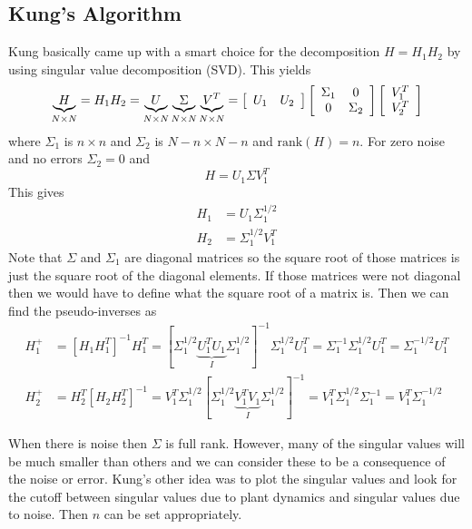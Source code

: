 \subsection{Kung's Algorithm}
Kung basically came up with a smart choice for the decomposition $H=H_1H_2$ by using singular value decomposition (SVD). This yields
$$\underbrace{H}_{N\times N} = H_1H_2 = \underbrace{U}_{N\times N} \underbrace{\Sigma}_{N\times N} \underbrace{V^T}_{N\times N} = \left[\begin{array}{c c} U_1 & U_2 \end{array}\right] \left[\begin{array}{c c} \Sigma_1 & 0 \\ 0 & \Sigma_2 \end{array}\right] \left[\begin{array}{c} V_1^T \\ V_2^T \end{array}\right]$$
where $\Sigma_1$ is $n\times n$ and $\Sigma_2$ is $N-n\times N-n$ and $\text{rank}(H)=n$. For zero noise and no errors $\Sigma_2=0$ and
$$H=U_1\Sigma V_1^T$$
This gives
\begin{align*}
H_1 &= U_1\Sigma_1^{1/2} \\
H_2 &= \Sigma_1^{1/2}V_1^T
\end{align*}
Note that $\Sigma$ and $\Sigma_1$ are diagonal matrices so the square root of those matrices is just the square root of the diagonal elements. If those matrices were not diagonal then we would have to define what the square root of a matrix is. Then we can find the pseudo-inverses as
\begin{align*}
H_1^+ &= [H_1H_1^T]^{-1}H_1^T = [\Sigma_1^{1/2}\underbrace{U_1^TU_1}_{I}\Sigma_1^{1/2}]^{-1}\Sigma_1^{1/2}U_1^T = \Sigma_1^{-1}\Sigma_1^{1/2}U_1^T = \Sigma_1^{-1/2}U_1^T \\
H_2^+ &= H_2^T[H_2H_2^T]^{-1} = V_1^T\Sigma_1^{1/2}[\Sigma_1^{1/2}\underbrace{V_1^TV_1}_{I}\Sigma_1^{1/2}]^{-1} = V_1^T\Sigma_1^{1/2}\Sigma_1^{-1} = V_1^T\Sigma_1^{-1/2}
\end{align*}

When there is noise then $\Sigma$ is full rank. However, many of the singular values will be much smaller than others and we can consider these to be a consequence of the noise or error. Kung's other idea was to plot the singular values and look for the cutoff between singular values due to plant dynamics and singular values due to noise. Then $n$ can be set appropriately.

